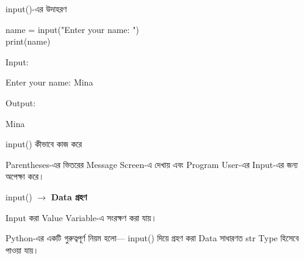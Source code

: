 \noindent
\begin{minipage}[t]{0.49\linewidth}
\begin{examplebox}{\textenglish{\ttfamily input()}-এর উদাহরণ}

\begin{codebox}
\begin{english}
\ttfamily
name = input("Enter your name: ")\\
print(name)
\end{english}
\end{codebox}

Input:
\begin{codebox}
\begin{english}
\ttfamily
Enter your name: Mina
\end{english}
\end{codebox}

Output:
\begin{codebox}
\begin{english}
\ttfamily
Mina
\end{english}
\end{codebox}

\end{examplebox}
\end{minipage}
\hfill
\begin{minipage}[t]{0.49\linewidth}
\begin{examplebox}{\textenglish{\ttfamily input()} কীভাবে কাজ করে}

Parentheses-এর ভিতরের Message Screen-এ দেখায় এবং Program
User-এর Input-এর জন্য অপেক্ষা করে।

\medskip

\begin{center}
\textenglish{\ttfamily input()}
\(\longrightarrow\)
\textbf{Data গ্রহণ}
\end{center}

Input করা Value Variable-এ সংরক্ষণ করা যায়।

\end{examplebox}
\end{minipage}



Python-এর একটি গুরুত্বপূর্ণ নিয়ম হলো—
\textenglish{\ttfamily input()}
দিয়ে গ্রহণ করা Data সাধারণত
\textenglish{\ttfamily str}
Type হিসেবে পাওয়া যায়।

